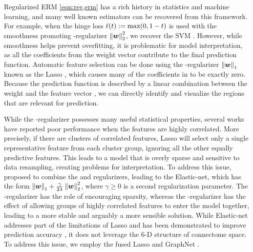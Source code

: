 Regularized ERM \eqref{eqn:reg,erm} has a rich history in statistics and machine learning, and many well known estimators can be recovered from this framework.
For example, when the hinge loss ${\ell(t):=\text{max}(0,1-t)}$ is used with the smoothness promoting \elltwo-regularizer $\left\| {\bm{w}} \right\|^2_2$, we recover the SVM \citep{Cortes:1995}.
However, while smoothness helps prevent overfitting, it is problematic for model interpretation, as all the coefficients from the weight vector contribute to the final prediction function.
Automatic feature selection can be done using the \ellone-regularizer $\left\| {\bm{w}} \right\|_1$ known as the Lasso \citep{Tibshirani:1996}, which causes many of the coefficients in \w to be exactly zero.
Because the prediction function is described by a linear combination between the weight \w and the feature vector \x, we can directly identify and visualize the regions that are relevant for prediction.

While the \ellone-regularizer possesses many useful statistical properties, several works have reported poor performance when the features are highly correlated.
More precisely, if there are clusters of correlated features, Lasso will select only a single representative feature from each cluster group, ignoring all the other equally predictive features.
This leads to a model that is overly sparse and sensitive to data resampling, creating problems for interpretation.
To address this issue, \cite{Zou:2005} proposed to combine the \ellone and \elltwo regularizers, leading to the Elastic-net, which has the form $\left\| {\bm{w}} \right\|_1+\frac{\gamma}{2\lambda}\left\| {\bm{w}} \right\|^2_2$, where $\gamma\geq 0$ is a second regularization parameter. 
The \ellone-regularizer has the role of encouraging sparsity, whereas the \elltwo-regularizer has the effect of allowing groups of highly correlated features to enter the model together, leading to a more stable and arguably a more sensible solution.  
While Elastic-net addresses part of the limitations of Lasso and has been demonstrated to improve prediction accuracy \citep{Carroll:2009,Ryali:2010}, it does not leverage the $6$-D structure of connectome space.  To address this issue, we employ the fused Lasso and GraphNet \citep{Grosenick:2013}.

